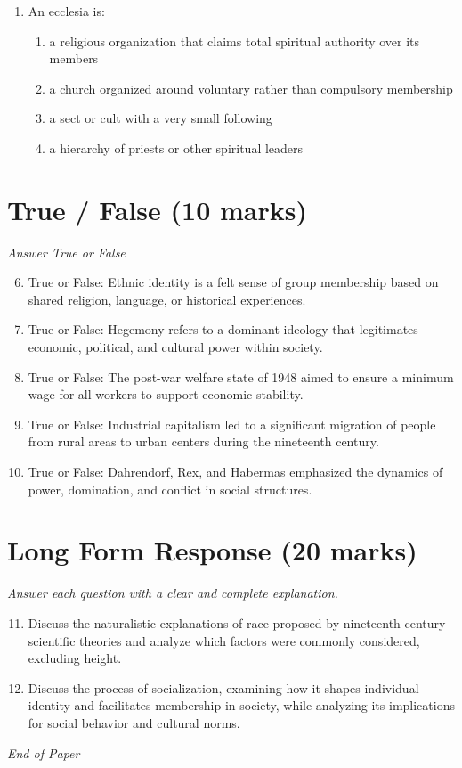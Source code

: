 \documentclass[12pt]{article}
\begin{document}
\begin{enumerate}[label=\arabic*.]
\begin{enumerate}[label=(\alph*)]
    \item the absence of fathers in many households
    \item the increasing number of single parent families
\end{enumerate}
\item An ecclesia is:
\begin{enumerate}[label=(\alph*)]
    \item a religious organization that claims total spiritual authority over its members
    \item a church organized around voluntary rather than compulsory membership
    \item a sect or cult with a very small following
    \item a hierarchy of priests or other spiritual leaders
\end{enumerate}
\end{enumerate}

\section*{True / False (10 marks)}
\textit{Answer True or False}
\begin{enumerate}[label=\arabic*.]
\setcounter{enumi}{5}
\item True or False: Ethnic identity is a felt sense of group membership based on shared religion, language, or historical experiences.
\item True or False: Hegemony refers to a dominant ideology that legitimates economic, political, and cultural power within society.
\item True or False: The post-war welfare state of 1948 aimed to ensure a minimum wage for all workers to support economic stability.
\item True or False: Industrial capitalism led to a significant migration of people from rural areas to urban centers during the nineteenth century.
\item True or False: Dahrendorf, Rex, and Habermas emphasized the dynamics of power, domination, and conflict in social structures.
\end{enumerate}

\section*{Long Form Response (20 marks)}
\textit{Answer each question with a clear and complete explanation.}
\begin{enumerate}[label=\arabic*.]
\setcounter{enumi}{10}
\item Discuss the naturalistic explanations of race proposed by nineteenth-century scientific theories and analyze which factors were commonly considered, excluding height.
\item Discuss the process of socialization, examining how it shapes individual identity and facilitates membership in society, while analyzing its implications for social behavior and cultural norms.
\end{enumerate}

\vfill
\noindent\textit{End of Paper}
\end{document}
